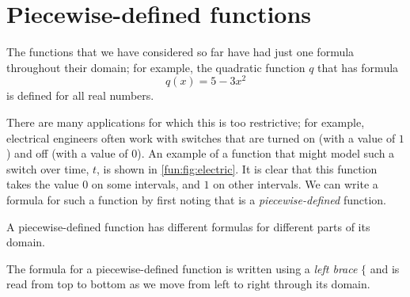 \section{Piecewise-defined functions}
The functions that we have considered so far have had just one formula 
throughout their domain; for example, the quadratic function $q$ that 
has formula
\[
    q(x)=5-3x^2
\]
is defined for all real numbers.
\begin{marginfigure}
  \centering
{}
\label{fun:fig:electric}
\end{marginfigure}

There are many applications for which this is 
too restrictive; for example, electrical engineers often work with switches 
that are turned on (with a value of $1$) and off (with a value of $0$). 
An example of a function that might model such a switch over time, $t$, is shown 
in \cref{fun:fig:electric}.
It is clear that this function takes the value $0$ on some intervals, 
and $1$ on other intervals. We can write a formula for such a function
by first noting that is a \emph{piecewise-defined} function.


\begin{pccdefinition}
  A piecewise-defined function has different formulas for different parts
  of its domain. 

  The formula for a piecewise-defined function is written using a \emph{left brace}
  $\{$ and is read from top to bottom as we move from left to right 
  through its domain.
\end{pccdefinition}

